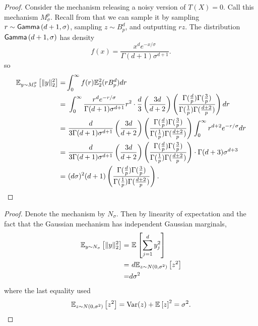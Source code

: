 \expectedKNorm*
\begin{proof}
    Consider the mechanism releasing a noisy version of $T(X) = 0$. Call this mechanism $M_\sigma^p$. Recall from  that we can sample it by sampling $r \sim \mathsf{Gamma}\left(d+1, \sigma\right)$, sampling $z \sim B_p^d$, and outputting $rz$. The distribution $\mathsf{Gamma}\left(d+1, \sigma\right)$ has density
    \begin{equation}
    \label{eq:gamma_density}
        f(x) = \frac{x^de^{-x/\sigma}}{\Gamma(d+1)\sigma^{d+1}}.
    \end{equation}
    so
    \begin{align*}
        \mathbb{E}_{y \sim M_\sigma^p}\left[ \|y\|_2^2 \right] =& \int_0^\infty f(r) \mathbb{E}_2^2(rB_p^d) dr \\
        =&\ \int_0^\infty \frac{r^de^{-r/\sigma}}{\Gamma(d+1)\sigma^{d+1}} r^2 \cdot \frac{d}{3}\left(\frac{3d}{d+2}\right)\left(\frac{\Gamma(\frac{d}{p}) \Gamma(\frac{3}{p})}{\Gamma(\frac{1}{p}) \Gamma(\frac{d+2}{p})}\right) dr \\
        =&\  \frac{d}{3\Gamma(d+1)\sigma^{d+1}}\left(\frac{3d}{d+2}\right)\left(\frac{\Gamma(\frac{d}{p}) \Gamma(\frac{3}{p})}{\Gamma(\frac{1}{p}) \Gamma(\frac{d+2}{p})}\right) \int_0^\infty r^{d+2}e^{-r/\sigma}dr \\
        =&\  \frac{d}{3\Gamma(d+1)\sigma^{d+1}}\left(\frac{3d}{d+2}\right)\left(\frac{\Gamma(\frac{d}{p}) \Gamma(\frac{3}{p})}{\Gamma(\frac{1}{p}) \Gamma(\frac{d+2}{p})}\right) \cdot \Gamma(d+3)\sigma^{d+3} \\
        =&\  (d\sigma)^2(d+1)\left(\frac{\Gamma(\frac{d}{p}) \Gamma(\frac{3}{p})}{\Gamma(\frac{1}{p}) \Gamma(\frac{d+2}{p})}\right).
    \end{align*}
\end{proof}

\gaussianExpectedSquaredNorm*
\begin{proof}
    Denote the mechanism by $N_\sigma$. Then by linearity of expectation and the fact that the Gaussian mechanism has independent Gaussian marginals,
    \begin{align*}
        \mathbb{E}_{y \sim N_\sigma}\left[ \|y\|_2^2
         \right] =&\ \mathbb{E}_{}\left[ \sum_{j=1}^d y_j^2 \right] \\
        =&\ d\mathbb{E}_{z \sim N(0, \sigma^2)}\left[ z^2 \right] \\
        =& d\sigma^2
    \end{align*}
    where the last equality used
    \begin{equation*}
        \mathbb{E}_{z \sim N(0, \sigma^2)}\left[ z^2 \right] = \text{Var}(z) + \mathbb{E}_{}\left[ z \right]^2 = \sigma^2.
    \end{equation*}
\end{proof}


